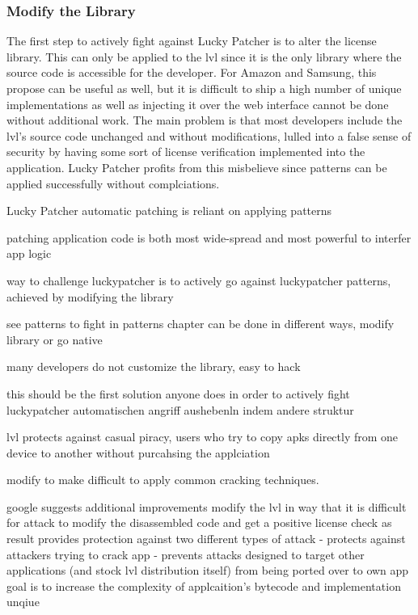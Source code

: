 \subsubsection{Modify the Library} \label{subsection:counter-modifications-library}
The first step to actively fight against Lucky Patcher is to alter the license library.
This can only be applied to the \gls{lvl} since it is the only library where the source code is accessible for the developer.
For Amazon and Samsung, this propose can be useful as well, but it is difficult to ship a high number of unique implementations as well as injecting it over the web interface cannot be done without additional work.
\newline
The main problem is that most developers include the \gls{lvl}'s source code unchanged and without modifications, lulled into a false sense of security by having some sort of license verification implemented into the application.
Lucky Patcher profits from this misbelieve since patterns can be applied successfully without complciations.




Lucky Patcher automatic patching is reliant on applying patterns

patching application code is both most wide-spread and most powerful to interfer app logic\cite{munteanLicense}

way to challenge luckypatcher is to actively go against luckypatcher patterns, achieved by modifying the library \cite{munteanLicense}

 see patterns to fight in patterns chapter
can be done in different ways, modify library or go native\cite{munteanLicense}

many developers do not customize the library, easy to hack
\cite{munteanLicense}
%

this should be the first solution anyone does in order to actively fight luckypatcher
automatischen angriff aushebenln indem andere struktur


lvl protects against casual piracy, users who try to copy apks directly from one device to another without purcahsing the applciation\cite{developersSecuring}

modify to make difficult to apply common cracking techniques. \cite{developersSecuring}



google suggests additional improvements \cite{developersSecuring}
modify the \gls{lvl} in way that it is difficult for attack to modify the disassembled code and get a positive license check as result \cite{developersSecuring}
provides protection against two different types of attack \cite{developersSecuring}
- protects against attackers trying to crack app \cite{developersSecuring}
- prevents attacks designed to target other applications (and stock lvl distribution itself) from being ported over to own app \cite{developersSecuring}
goal is to increase the complexity of applcaition's bytecode and implementation unqiue \cite{developersSecuring}

